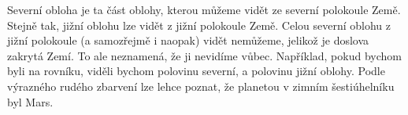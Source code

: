 \documentclass{../../../../style/mkimain}
\begin{document}
\noindent{}
\klein
Severní obloha je ta část oblohy, kterou můžeme vidět ze severní polokoule Země. 
Stejně tak, jižní oblohu lze vidět z jižní polokoule Země.
Celou severní oblohu z jižní polokoule (a samozřejmě i naopak) vidět nemůžeme, jelikož je doslova zakrytá Zemí.
To ale neznamená, že ji nevidíme vůbec.
Například, pokud bychom byli na rovníku, viděli bychom polovinu severní, a polovinu jižní oblohy.
Podle výrazného rudého zbarvení lze lehce poznat, že planetou v zimním šestiúhelníku byl Mars. 
\end{document}
